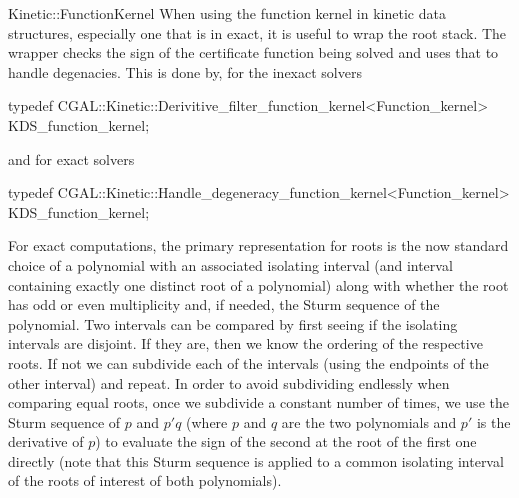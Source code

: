 \begin{ccRefConcept}{Kinetic::FunctionKernel}
When using the function kernel in kinetic data structures, especially
one that is in exact, it is useful to wrap the root stack. The wrapper
checks the sign of the certificate function being solved and uses that
to handle degenacies. This is done by, for the inexact solvers 
\begin{ccExampleCode}
typedef CGAL::Kinetic::Derivitive_filter_function_kernel<Function_kernel> KDS_function_kernel;
\end{ccExampleCode}
and for exact solvers
\begin{ccExampleCode}
typedef CGAL::Kinetic::Handle_degeneracy_function_kernel<Function_kernel> KDS_function_kernel;
\end{ccExampleCode}

For exact computations, the primary representation for roots is the
now standard choice of a polynomial with an associated isolating
interval (and interval containing exactly one distinct root of a
polynomial) along with whether the root has odd or even multiplicity
and, if needed, the Sturm sequence of the polynomial. Two intervals
can be compared by first seeing if the isolating intervals are
disjoint. If they are, then we know the ordering of the respective
roots. If not we can subdivide each of the intervals (using the
endpoints of the other interval) and repeat. In order to avoid
subdividing endlessly when comparing equal roots, once we subdivide a
constant number of times, we use the Sturm sequence of $p$ and $p'q$
(where $p$ and $q$ are the two polynomials and $p'$ is the derivative
of $p$) to evaluate the sign of the second at the root of the first
one directly (note that this Sturm sequence is applied to a common
isolating interval of the roots of interest of both polynomials).



\end{ccRefConcept}



